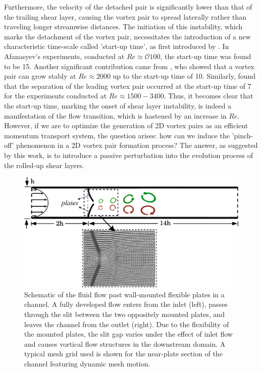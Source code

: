 \documentclass[final,3p,times,authoryear]{elsarticle}
\begin{document}
	Furthermore, the velocity of the detached pair is significantly lower than that of the trailing shear layer, causing the vortex pair to spread laterally rather than traveling longer streamwise distances. The initiation of this instability, which marks the detachment of the vortex pair, necessitates the introduction of a new characteristic time-scale called 'start-up time', as first introduced by \cite{Afanasyev2006}. In Afanasyev's experiments, conducted at $Re\approx \mathcal{O}100$, the start-up time was found to be 15. Another significant contribution came from \cite{pedrizzetti_2010}, who showed that a vortex pair can grow stably at $Re\approx2000$ up to the start-up time of 10. Similarly, \cite{Gao_Yu_2016} found that the separation of the leading vortex pair occurred at the start-up time of 7 for the experiments conducted at $Re\approx1500-3400$. Thus, it becomes clear that the start-up time, marking the onset of shear layer instability, is indeed a manifestation of the flow transition, which is hastened by an increase in $Re$. However, if we are to optimize the generation of 2D vortex pairs as an efficient momentum transport system, the question arises: how can we induce the 'pinch-off' phenomenon in a 2D vortex pair formation process? The answer, as suggested by this work, is to introduce a passive perturbation into the evolution process of the rolled-up shear layers.
	\begin{figure}[h]
		\centering
		\begin{minipage}[c]{0.95\linewidth}
			\includegraphics[width=1\linewidth]{Figures/Schematic-01.png} 
		\end{minipage} 		
		\caption{Schematic of the fluid flow past wall-mounted flexible plates in a channel. A fully developed flow enters from the inlet (left), passes through the slit between the two oppositely mounted plates, and leaves the channel from the outlet (right). Due to the flexibility of the mounted plates, the slit gap varies under the effect of inlet flow and causes vortical flow structures in the downstream domain. A typical mesh grid used is shown for the near-plate section of the channel featuring dynamic mesh motion.}	
		\label{fig:schematic}
	\end{figure}
\end{document}
